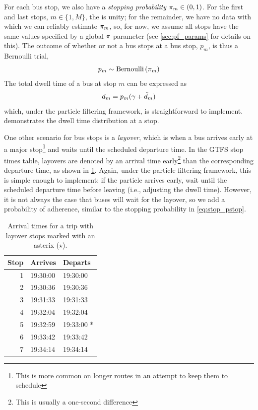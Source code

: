 For each bus stop, we also have a \emph{stopping probability} $\pi_m\in(0,1)$. For the first and last stops, $m\in\{1,M\}$, the is unity; for the remainder, we have no data with which we can reliably estimate $\pi_m$, so, for now, we assume all stops have the same values specified by a global $\pi$ parameter (see \cref{sec:pf_params} for details on this). The outcome of whether or not a bus stops at a bus stop, $p_m$, is thus a Bernoulli trial,
\begin{equation}
\label{eq:stop_pstop}
p_m \sim \mathrm{Bernoulli}\left(\pi_m\right)
\end{equation}
The total dwell time of a bus at stop $m$ can be expressed as
\begin{equation}
\label{eq:stop_total_dwell_time}
d_m = p_m (\gamma + \tilde d_m)
\end{equation}
which, under the particle filtering framework, is straightforward to implement.  demonstrates the dwell time distribution at a stop.

One other scenario for bus stops is a \emph{layover}, which is when a bus arrives early at a major stop\footnote{This is more common on longer routes in an attempt to keep them to schedule} and waits until the scheduled departure time. In the GTFS stop times table, layovers are denoted by an arrival time early\footnote{This is usually a one-second difference} than the corresponding departure time, as shown in \cref{tab:layover_times}. Again, under the particle filtering framework, this is simple enough to implement: if the particle arrives early, wait until the scheduled departure time before leaving (i.e., adjusting the dwell time). However, it is not always the case that buses will wait for the layover, so we add a probability of adherence, similar to the stopping probability in \cref{eq:stop_pstop}.

\begin{knitrout}\small
{}\color{fgcolor}\begin{table}

\caption{\label{tab:layover_times}Arrival times for a trip with layover stops marked with an asterix ($\star$).}
\centering
\fontsize{8}{10}\selectfont
\begin{tabular}[t]{rll}
\toprule
Stop & Arrives & Departs\\
\midrule
1 & 19:30:00 & 19:30:00\\
2 & 19:30:36 & 19:30:36\\
3 & 19:31:33 & 19:31:33\\
4 & 19:32:04 & 19:32:04\\
5 & 19:32:59 & 19:33:00 *\\
6 & 19:33:42 & 19:33:42\\
7 & 19:34:14 & 19:34:14\\
\bottomrule
\end{tabular}
\end{table}


\end{knitrout}


